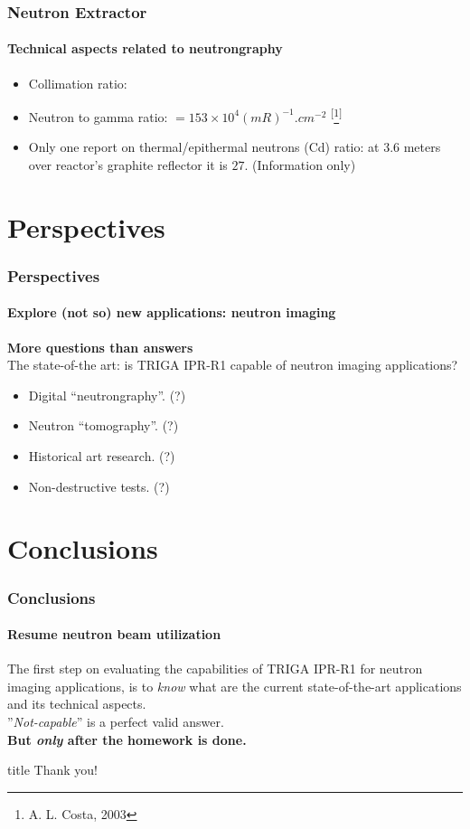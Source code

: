 \documentclass[svgnames,smaller,table]{beamer}
\begin{document}
\begin{frame}
  \frametitle{Neutron Extractor}
  \framesubtitle{Technical aspects related to neutrongraphy}
    \begin{itemize}
    \item Collimation ratio: 
    \item Neutron to gamma ratio:  $ = 153 \times 10^4 (mR)^{-1}.cm^{-2}$ \textsuperscript{[}\footnote{A. L. Costa, 2003}\textsuperscript{]} 
    \item Only one report on thermal/epithermal neutrons (Cd) ratio: at 3.6 meters over reactor's graphite reflector it is $27$. (Information only) 
    \end{itemize}
\end{frame}

\section{Perspectives}
\begin{frame}
  \frametitle{Perspectives}
  \framesubtitle{Explore (not so) new applications: neutron imaging}
  \textbf{More questions than answers}\\
  \vspace{10px}
  The state-of-the art: is TRIGA IPR-R1 capable of neutron imaging applications?\\
  \begin{itemize}
  \item Digital ``neutrongraphy''. (?)
  \item Neutron ``tomography''. (?)
  \item Historical art research. (?)
  \item Non-destructive tests. (?)
  \end{itemize}
\end{frame}

\section{Conclusions}
\begin{frame}
  \frametitle{Conclusions}
  \framesubtitle{Resume neutron beam utilization}
  The first step on evaluating the capabilities of TRIGA IPR-R1 for neutron imaging applications, is to \textit{know} what are the current state-of-the-art applications and its technical aspects.\\
  \vspace{10px}
  ''\textit{Not-capable}'' is a perfect valid answer.\\
  \vspace{10px}
  \pause
  \textbf{But \textit{only} after the homework is done.}
\end{frame}



\begin{frame}
 \vfill
  \begin{beamercolorbox}[center]{title}
     \Huge{Thank you!}
  \end{beamercolorbox}
  \vfill
\end{frame}
\end{document}
